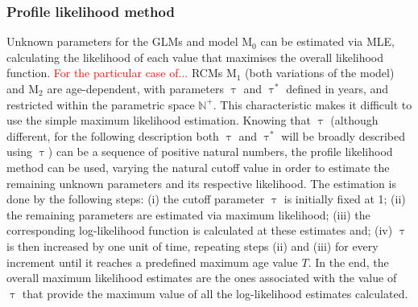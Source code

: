 \subsubsection{Profile likelihood method}

Unknown parameters for the GLMs and model M$_0$ can be estimated via MLE, calculating the likelihood of each value that maximises the overall likelihood function.
\textcolor{red}{For the particular case of...}
RCMs M$_1$ (both variations of the model) and M$_2$ are
age-dependent, with parameters $\uptau$ and $\uptau^*$ defined in years, and restricted within the parametric space $\mathbb{N}^{+}$.
This characteristic makes it difficult to use the simple maximum likelihood estimation.
Knowing that $\uptau$ (although different, for the following description both $\uptau$ and $\uptau^*$ will be broadly described using $\uptau$) can be a sequence of positive natural numbers, the profile likelihood method can be used, varying the natural cutoff value in order to estimate the remaining unknown parameters and its respective likelihood.
The estimation is done by the following steps:
(i) the cutoff parameter $\uptau$ is initially fixed at 1;
(ii) the remaining parameters are estimated via maximum likelihood;
(iii) the corresponding log-likelihood function is calculated at these estimates and;
(iv) $\uptau$ is then increased by one unit of time, repeating steps (ii) and (iii) for every increment until it reaches a predefined maximum age value $T$.
In the end, the overall maximum likelihood estimates are the ones associated with the value of $\uptau$ that provide the maximum value of all the log-likelihood estimates calculated.

